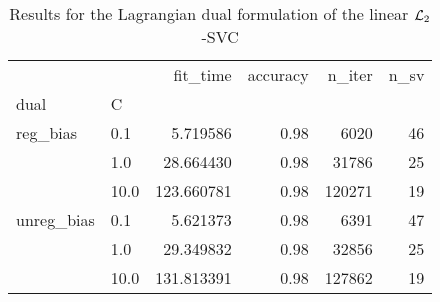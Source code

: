 \begin{table}[H]
\centering
\caption{Results for the Lagrangian dual formulation of the linear $\protect \mathcal{L}_2$-SVC}
\label{linear_lagrangian_dual_l2_svc_cv_results}
\begin{tabular}{llrrrr}
\toprule
           &      &    fit\_time &  accuracy &  n\_iter &  n\_sv \\
dual & C &             &           &         &       \\
\midrule
reg\_bias & 0.1  &    5.719586 &      0.98 &    6020 &    46 \\
           & 1.0  &   28.664430 &      0.98 &   31786 &    25 \\
           & 10.0 &  123.660781 &      0.98 &  120271 &    19 \\
unreg\_bias & 0.1  &    5.621373 &      0.98 &    6391 &    47 \\
           & 1.0  &   29.349832 &      0.98 &   32856 &    25 \\
           & 10.0 &  131.813391 &      0.98 &  127862 &    19 \\
\bottomrule
\end{tabular}
\end{table}

